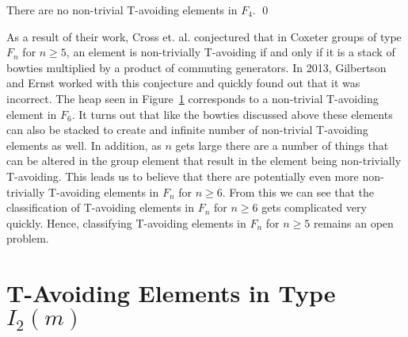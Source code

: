 \begin{corollary}
There are no non-trivial T-avoiding elements in $F_4$. \qed	
\end{corollary}

As a result of their work, Cross et. al. conjectured that in Coxeter groups of type $F_n$ for $n \geq 5$, an element is non-trivially T-avoiding if and only if it is a stack of bowties multiplied by a product of commuting generators. In 2013, Gilbertson and Ernst worked with this conjecture and quickly found out that it was incorrect. The heap seen in Figure~\ref{} corresponds to a non-trivial T-avoiding element in $F_6$. It turns out that like the bowties discussed above these elements can also be stacked to create and infinite number of non-trivial T-avoiding elements as well. In addition, as $n$ gets large there are a number of things that can be altered in the group element that result in the element being non-trivially T-avoiding. This leads us to believe that there are potentially even more non-trivially T-avoiding elements in $F_n$ for $n \geq 6$. From this we can see that the classification of T-avoiding elements in $F_n$ for $n \geq 6$ gets complicated very quickly. Hence, classifying T-avoiding elements in $F_n$ for $n \geq 5$ remains an open problem. 


\section{T-Avoiding Elements in Type $I_2(m)$}

